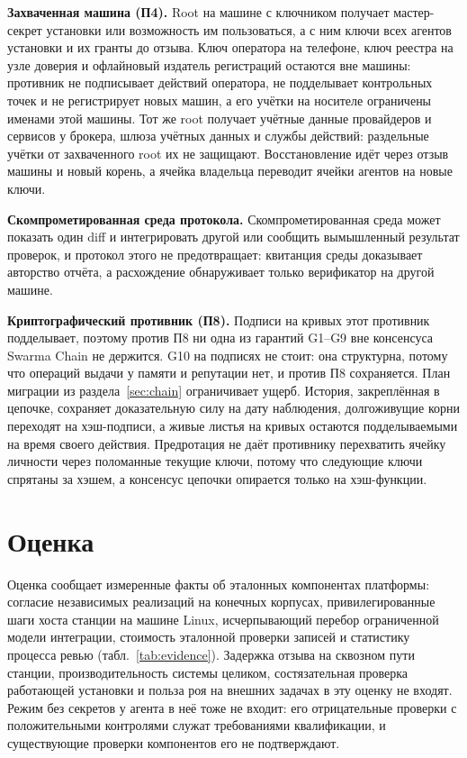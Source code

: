 \documentclass[10pt,a4paper]{article}
\begin{document}
\textbf{Захваченная машина (П4).} Root на машине с ключником получает мастер-секрет установки или возможность им пользоваться, а с ним ключи всех агентов установки и их гранты до отзыва. Ключ оператора на телефоне, ключ реестра на узле доверия и офлайновый издатель регистраций остаются вне машины: противник не подписывает действий оператора, не подделывает контрольных точек и не регистрирует новых машин, а его учётки на носителе ограничены именами этой машины. Тот же root получает учётные данные провайдеров и сервисов у брокера, шлюза учётных данных и службы действий: раздельные учётки от захваченного root их не защищают. Восстановление идёт через отзыв машины и новый корень, а ячейка владельца переводит ячейки агентов на новые ключи.

\textbf{Скомпрометированная среда протокола.} Скомпрометированная среда может показать один diff и интегрировать другой или сообщить вымышленный результат проверок, и протокол этого не предотвращает: квитанция среды доказывает авторство отчёта, а расхождение обнаруживает только верификатор на другой машине.

\textbf{Криптографический противник (П8).} Подписи на кривых этот противник подделывает, поэтому против П8 ни одна из гарантий G1--G9 вне консенсуса Swarma Chain не держится. G10 на подписях не стоит: она структурна, потому что операций выдачи у памяти и репутации нет, и против П8 сохраняется. План миграции из раздела~\ref{sec:chain} ограничивает ущерб. История, закреплённая в цепочке, сохраняет доказательную силу на дату наблюдения, долгоживущие корни переходят на хэш-подписи, а живые листья на кривых остаются подделываемыми на время своего действия. Предротация не даёт противнику перехватить ячейку личности через поломанные текущие ключи, потому что следующие ключи спрятаны за хэшем, а консенсус цепочки опирается только на хэш-функции.

\section{Оценка}
\label{sec:eval}

Оценка сообщает измеренные факты об эталонных компонентах платформы: согласие независимых реализаций на конечных корпусах, привилегированные шаги хоста станции на машине Linux, исчерпывающий перебор ограниченной модели интеграции, стоимость эталонной проверки записей и статистику процесса ревью (табл.~\ref{tab:evidence}). Задержка отзыва на сквозном пути станции, производительность системы целиком, состязательная проверка работающей установки и польза роя на внешних задачах в эту оценку не входят. Режим без секретов у агента в неё тоже не входит: его отрицательные проверки с положительными контролями служат требованиями квалификации, и существующие проверки компонентов его не подтверждают.
\end{document}
